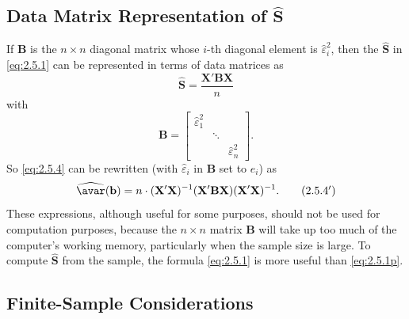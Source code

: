 \subsection*{Data Matrix Representation of $\widehat{\mathbf{S}}$}

If $\mathbf{B}$ is the $n \times n$ diagonal matrix whose $i$-th diagonal element is
$\hat{\varepsilon}_i^2$, then the $\widehat{\mathbf{S}}$ in \eqref{eq:2.5.1} can be
represented in terms of data matrices as
\begin{equation}
  \widehat{\mathbf{S}} = \frac{\mathbf{X}' \mathbf{B} \mathbf{X}}{n}
  \tag{2.5.1$'$}
  \label{eq:2.5.1p}
\end{equation}
with
\[
  \mathbf{B} = \begin{bmatrix}
    \hat{\varepsilon}_1^2 & & \\
    & \ddots & \\
    & & \hat{\varepsilon}_n^2
  \end{bmatrix}.
\]
So \eqref{eq:2.5.4} can be rewritten (with $\hat{\varepsilon}_i$ in $\mathbf{B}$ set to
$e_i$) as
\begin{equation}
  \widehat{\avar}(\mathbf{b}) = n \cdot (\mathbf{X}'\mathbf{X})^{-1}
    (\mathbf{X}'\mathbf{B}\mathbf{X})(\mathbf{X}'\mathbf{X})^{-1}.
  \tag{2.5.4$'$}
  \label{eq:2.5.4p}
\end{equation}
These expressions, although useful for some purposes, should not be used for computation
purposes, because the $n \times n$ matrix $\mathbf{B}$ will take up too much of the
computer's working memory, particularly when the sample size is large.  To compute
$\widehat{\mathbf{S}}$ from the sample, the formula \eqref{eq:2.5.1} is more useful than
\eqref{eq:2.5.1p}.

\subsection*{Finite-Sample Considerations}

